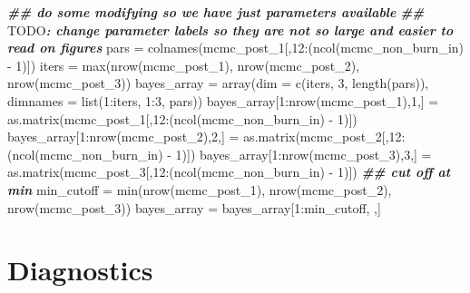 \documentclass[
]{book}
\newenvironment{Shaded}{\begin{snugshade}}{\end{snugshade}}
\newcommand{\AlertTok}[1]{\textcolor[rgb]{0.94,0.16,0.16}{#1}}
\newcommand{\AttributeTok}[1]{\textcolor[rgb]{0.77,0.63,0.00}{#1}}
\newcommand{\DecValTok}[1]{\textcolor[rgb]{0.00,0.00,0.81}{#1}}
\newcommand{\DocumentationTok}[1]{\textcolor[rgb]{0.56,0.35,0.01}{\textbf{\textit{#1}}}}
\newcommand{\FunctionTok}[1]{\textcolor[rgb]{0.00,0.00,0.00}{#1}}
\newcommand{\NormalTok}[1]{#1}
\newcommand{\OtherTok}[1]{\textcolor[rgb]{0.56,0.35,0.01}{#1}}
\newcommand{\SpecialCharTok}[1]{\textcolor[rgb]{0.00,0.00,0.00}{#1}}
\begin{document}
\begin{Shaded}
\begin{Highlighting}[]
\DocumentationTok{\#\# do some modifying so we have just parameters available}
\DocumentationTok{\#\# }\AlertTok{TODO}\DocumentationTok{: change parameter labels so they are not so large and easier to read on figures}
\NormalTok{pars }\OtherTok{=} \FunctionTok{colnames}\NormalTok{(mcmc\_post\_1[,}\DecValTok{12}\SpecialCharTok{:}\NormalTok{(}\FunctionTok{ncol}\NormalTok{(mcmc\_non\_burn\_in) }\SpecialCharTok{{-}} \DecValTok{1}\NormalTok{)])}
\NormalTok{iters }\OtherTok{=} \FunctionTok{max}\NormalTok{(}\FunctionTok{nrow}\NormalTok{(mcmc\_post\_1), }\FunctionTok{nrow}\NormalTok{(mcmc\_post\_2), }\FunctionTok{nrow}\NormalTok{(mcmc\_post\_3))}
\NormalTok{bayes\_array }\OtherTok{=} \FunctionTok{array}\NormalTok{(}\AttributeTok{dim =} \FunctionTok{c}\NormalTok{(iters, }\DecValTok{3}\NormalTok{, }\FunctionTok{length}\NormalTok{(pars)), }\AttributeTok{dimnames =} \FunctionTok{list}\NormalTok{(}\DecValTok{1}\SpecialCharTok{:}\NormalTok{iters, }\DecValTok{1}\SpecialCharTok{:}\DecValTok{3}\NormalTok{, pars))}
\NormalTok{bayes\_array[}\DecValTok{1}\SpecialCharTok{:}\FunctionTok{nrow}\NormalTok{(mcmc\_post\_1),}\DecValTok{1}\NormalTok{,] }\OtherTok{=} \FunctionTok{as.matrix}\NormalTok{(mcmc\_post\_1[,}\DecValTok{12}\SpecialCharTok{:}\NormalTok{(}\FunctionTok{ncol}\NormalTok{(mcmc\_non\_burn\_in) }\SpecialCharTok{{-}} \DecValTok{1}\NormalTok{)])}
\NormalTok{bayes\_array[}\DecValTok{1}\SpecialCharTok{:}\FunctionTok{nrow}\NormalTok{(mcmc\_post\_2),}\DecValTok{2}\NormalTok{,] }\OtherTok{=} \FunctionTok{as.matrix}\NormalTok{(mcmc\_post\_2[,}\DecValTok{12}\SpecialCharTok{:}\NormalTok{(}\FunctionTok{ncol}\NormalTok{(mcmc\_non\_burn\_in) }\SpecialCharTok{{-}} \DecValTok{1}\NormalTok{)])}
\NormalTok{bayes\_array[}\DecValTok{1}\SpecialCharTok{:}\FunctionTok{nrow}\NormalTok{(mcmc\_post\_3),}\DecValTok{3}\NormalTok{,] }\OtherTok{=} \FunctionTok{as.matrix}\NormalTok{(mcmc\_post\_3[,}\DecValTok{12}\SpecialCharTok{:}\NormalTok{(}\FunctionTok{ncol}\NormalTok{(mcmc\_non\_burn\_in) }\SpecialCharTok{{-}} \DecValTok{1}\NormalTok{)])}
\DocumentationTok{\#\# cut off at min}
\NormalTok{min\_cutoff }\OtherTok{=} \FunctionTok{min}\NormalTok{(}\FunctionTok{nrow}\NormalTok{(mcmc\_post\_1), }\FunctionTok{nrow}\NormalTok{(mcmc\_post\_2), }\FunctionTok{nrow}\NormalTok{(mcmc\_post\_3))}
\NormalTok{bayes\_array }\OtherTok{=}\NormalTok{ bayes\_array[}\DecValTok{1}\SpecialCharTok{:}\NormalTok{min\_cutoff, ,]}
\end{Highlighting}
\end{Shaded}

\hypertarget{diagnostics}{%
\section{Diagnostics}\label{diagnostics}}
\end{document}
